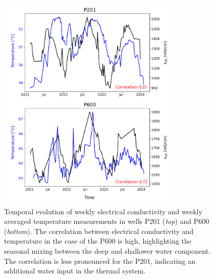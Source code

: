 \newpage
\null
\vfill
\begin{figure}[H]
\centering
\includegraphics[width=0.8\textwidth]{chapters/06_appendix/SI_C2/EC_vs_temp.pdf}
\caption{Temporal evolution of weekly electrical conductivity and weekly averaged temperature measurements in wells P201 (\textit{top}) and P600 (\textit{bottom}).
The correlation between electrical conductivity and temperature in the case of the P600 is high, highlighting the seasonal mixing between the deep and shallower water component. 
The correlation is less pronounced for the P201, indicating an additional water input in the thermal system.
}
\label{figSI:EC_vs_temp}
\end{figure}
\vfill 


